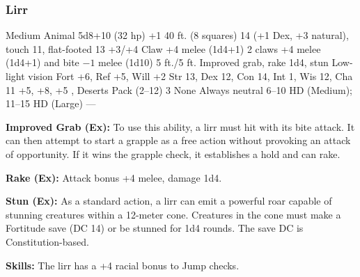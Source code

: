 \subsubsection{Lirr}
\begin{MonsterStats}
{Medium Animal}
{5d8+10 (32 hp)}
{+1}
{40 ft. (8 squares)}
{14 (+1 Dex, +3 natural), touch 11, flat-footed 13}
{+3/+4}
{Claw +4 melee (1d4+1)}
{2 claws +4 melee (1d4+1) and bite $-1$ melee (1d10)}
{5 ft./5 ft.}
{Improved grab, rake 1d4, stun}
{Low-light vision}
{Fort +6, Ref +5, Will +2}
{Str 13, Dex 12, Con 14, Int 1, Wis 12, Cha 11}
{ +5,  +8,  +5}
{, }
{Deserts}
{Pack (2--12)}
{3}
{None}
{Always neutral}
{6--10 HD (Medium); 11--15 HD (Large)}
{---}
\end{MonsterStats}

\textbf{Improved Grab (Ex):} To use this ability, a lirr must hit with its bite attack. It can then attempt to start a grapple as a free action without provoking an attack of opportunity. If it wins the grapple check, it establishes a hold and can rake.

\textbf{Rake (Ex):} Attack bonus +4 melee, damage 1d4.

\textbf{Stun (Ex):} As a standard action, a lirr can emit a powerful roar capable of stunning creatures within a 12-meter cone. Creatures in the cone must make a Fortitude save (DC 14) or be stunned for 1d4 rounds. The save DC is Constitution-based.

\textbf{Skills:} The lirr has a +4 racial bonus to Jump checks.
